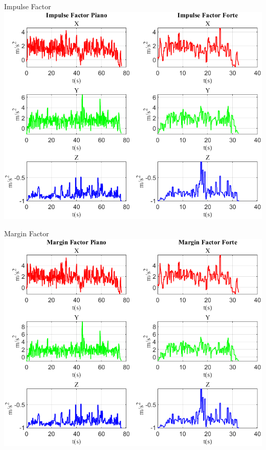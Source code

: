 	\begin{frame}{{Impulse Factor}}
		\centering\includegraphics[height=.8\textheight]{figure/Acc/Impulse Factor}
	\end{frame}
	
	\begin{frame}{{Margin Factor}}
		\centering\includegraphics[height=.8\textheight]{figure/Acc/Margin Factor}
	\end{frame}
	

